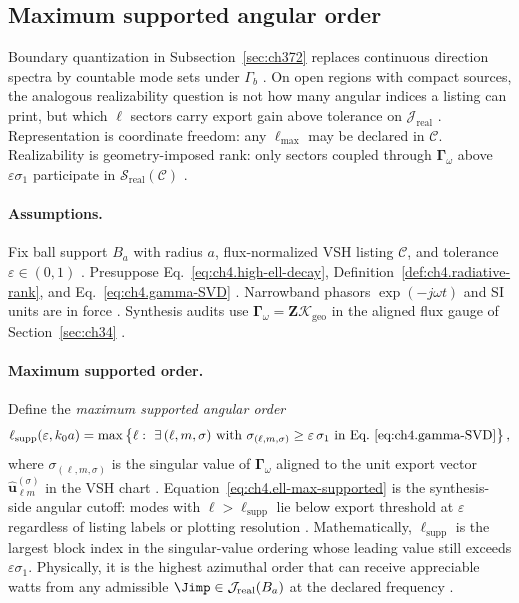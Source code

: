 ﻿\subsection{Maximum supported angular order}
\label{sec:ch461}

Boundary quantization in Subsection~\ref{sec:ch372} replaces continuous direction spectra by countable mode sets under
\(\Gamma_{b}\) \cite{stratton1941,harrington2001}. On open regions with compact sources, the analogous realizability question is not
how many angular indices a listing can print, but which \(\ell\) sectors carry export gain above tolerance on
\(\mathcal{J}_{\mathrm{real}}\) \cite{hansen1988,devaney2004}. Representation is coordinate freedom: any \(\ell_{\max}\) may be
declared in \(\mathcal{C}\). Realizability is geometry-imposed rank: only sectors coupled through \(\boldsymbol{\Gamma}_\omega\) above
\(\varepsilon\sigma_{1}\) participate in \(\mathcal{S}_{\mathrm{real}}(\mathcal{C})\) \cite{stratton1941,harrington2001}.

\paragraph{Assumptions.}
Fix ball support \(B_{a}\) with radius \(a\), flux-normalized VSH listing \(\mathcal{C}\), and tolerance \(\varepsilon\in(0,1)\)
\cite{stratton1941,hansen1988}. Presuppose Eq.~\eqref{eq:ch4.high-ell-decay}, Definition~\ref{def:ch4.radiative-rank}, and
Eq.~\eqref{eq:ch4.gamma-SVD} \cite{harrington2001,devaney2004}. Narrowband phasors \(\exp(-j\omega t)\) and SI units are in force
\cite{jackson1999}. Synthesis audits use \(\boldsymbol{\Gamma}_\omega=\mathbf{Z}\boldsymbol{\mathcal{K}}_{\mathrm{geo}}\) in the aligned
flux gauge of Section~\ref{sec:ch34} \cite{hansen1988}.

\paragraph{Maximum supported order.}
Define the \emph{maximum supported angular order}
\begin{equation}
\label{eq:ch4.ell-max-supported}
\ell_{\mathrm{supp}}(\varepsilon,k_{0}a)
=
\max\left\{
\ell:\ \exists\,(\ell,m,\sigma)\ \text{with}\ 
\sigma_{(\ell,m,\sigma)}\ge\varepsilon\,\sigma_{1}
\ \text{in Eq.~\eqref{eq:ch4.gamma-SVD}}
\right\},
\end{equation}
where \(\sigma_{(\ell,m,\sigma)}\) is the singular value of \(\boldsymbol{\Gamma}_\omega\) aligned to the unit export vector
\(\widehat{\mathbf{u}}_{\ell m}^{(\sigma)}\) in the VSH chart \cite{harrington2001,hansen1988}. Equation~\eqref{eq:ch4.ell-max-supported}
is the synthesis-side angular cutoff: modes with \(\ell>\ell_{\mathrm{supp}}\) lie below export threshold at \(\varepsilon\) regardless of
listing labels or plotting resolution \cite{stratton1941,devaney2004}. Mathematically, \(\ell_{\mathrm{supp}}\) is the largest block index in
the singular-value ordering whose leading value still exceeds \(\varepsilon\sigma_{1}\). Physically, it is the highest azimuthal order that
can receive appreciable watts from any admissible \(\Jimp\in\mathcal{J}_{\mathrm{real}}(B_{a})\) at the declared frequency
\cite{hansen1988,jackson1999}.

